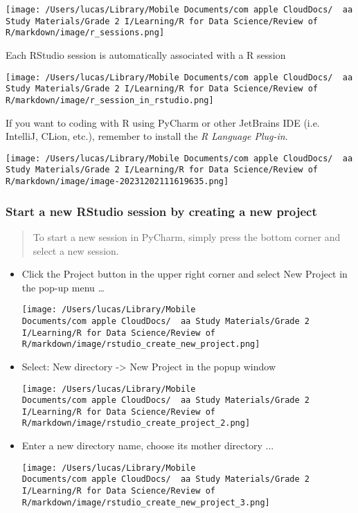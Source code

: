 \documentclass[
]{article}
\let\oldincludegraphics\includegraphics
\renewcommand{\includegraphics}[2][]{\begin{center}\oldincludegraphics[#1]{#2}\end{center}}
\begin{document}
\texttt{[image: /Users/lucas/Library/Mobile Documents/com~apple~CloudDocs/~~aa Study Materials/Grade 2 I/Learning/R for Data Science/Review of R/markdown/image/r\_sessions.png]}

Each RStudio session is automatically associated with a R session

\texttt{[image: /Users/lucas/Library/Mobile Documents/com~apple~CloudDocs/~~aa Study Materials/Grade 2 I/Learning/R for Data Science/Review of R/markdown/image/r\_session\_in\_rstudio.png]}

If you want to coding with R using PyCharm or other JetBrains IDE (i.e.
IntelliJ, CLion, etc.), remember to install the \emph{R Language
Plug-in}.

\texttt{[image: /Users/lucas/Library/Mobile Documents/com~apple~CloudDocs/~~aa Study Materials/Grade 2 I/Learning/R for Data Science/Review of R/markdown/image/image-20231202111619635.png]}

\hypertarget{start-a-new-rstudio-session-by-creating-a-new-project}{%
\subsubsection{Start a new RStudio session by creating a new
project}\label{start-a-new-rstudio-session-by-creating-a-new-project}}

\begin{quote}
To start a new session in PyCharm, simply press the bottom corner and
select a new session.
\end{quote}

\begin{itemize}
\item
  Click the Project button in the upper right corner and select New
  Project in the pop-up menu \ldots{}

  \texttt{[image: /Users/lucas/Library/Mobile Documents/com~apple~CloudDocs/~~aa Study Materials/Grade 2 I/Learning/R for Data Science/Review of R/markdown/image/rstudio\_create\_new\_project.png]}
\item
  Select: New directory -\textgreater{} New Project in the popup window

  \texttt{[image: /Users/lucas/Library/Mobile Documents/com~apple~CloudDocs/~~aa Study Materials/Grade 2 I/Learning/R for Data Science/Review of R/markdown/image/rstudio\_create\_project\_2.png]}
\item
  Enter a new directory name, choose its mother directory ...

  \texttt{[image: /Users/lucas/Library/Mobile Documents/com~apple~CloudDocs/~~aa Study Materials/Grade 2 I/Learning/R for Data Science/Review of R/markdown/image/rstudio\_create\_new\_project\_3.png]}
\end{itemize}
\end{document}
